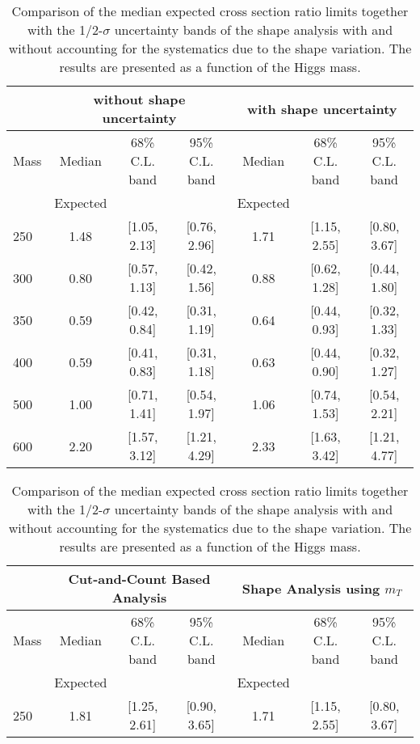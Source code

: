 \begin{table}[!ht]
\begin{center}
{\normalsize
\begin{tabular}{|l|c|c|c|c|c|c|}
\hline
      &  \multicolumn{3}{c|}{ without shape uncertainty} &\multicolumn{3}{c|}{ with shape uncertainty} \\
\hline
Mass  &  Median      &     68\% C.L. band &  95\% C.L. band &  Median	   &	 68\% C.L. band &  95\% C.L. band\\
      &  Expected    &                    &                 &  Expected    &			&		 \\
\hline
250 & 1.48 & [1.05, 2.13] & [0.76, 2.96] & 1.71 & [1.15, 2.55] & [0.80, 3.67] \\
300 & 0.80 & [0.57, 1.13] & [0.42, 1.56] & 0.88 & [0.62, 1.28] & [0.44, 1.80] \\
350 & 0.59 & [0.42, 0.84] & [0.31, 1.19] & 0.64 & [0.44, 0.93] & [0.32, 1.33] \\
400 & 0.59 & [0.41, 0.83] & [0.31, 1.18] & 0.63 & [0.44, 0.90] & [0.32, 1.27]\\
500 & 1.00 & [0.71, 1.41] & [0.54, 1.97] & 1.06 & [0.74, 1.53] & [0.54, 2.21]\\
600 & 2.20 & [1.57, 3.12] & [1.21, 4.29] & 2.33 & [1.63, 3.42] & [1.21, 4.77]\\
\hline
\end{tabular}
}
\caption{Comparison of the median expected cross section ratio limits together with the 1/2-$\sigma$ uncertainty bands of 
the shape analysis with and without accounting for the systematics due to the shape variation. 
The results are presented as a function of the Higgs mass. }
\label{tab:mva_mtshapewithwithout_hzz}
\end{center}
\begin{center}
{\normalsize
\begin{tabular}{|l|c|c|c|c|c|c|}
\hline
      &  \multicolumn{3}{c|}{Cut-and-Count Based Analysis} &\multicolumn{3}{c|}{Shape Analysis using $m_T$} \\
\hline
Mass  &  Median      &     68\% C.L. band &  95\% C.L. band &  Median	   &	 68\% C.L. band &  95\% C.L. band\\
      &  Expected    &                    &                 &  Expected    &			&		 \\
\hline
250 & 1.81 & [1.25, 2.61] & [0.90, 3.65] & 1.71 & [1.15, 2.55] & [0.80, 3.67] \\

\end{tabular}}
\end{center}
\end{table}
